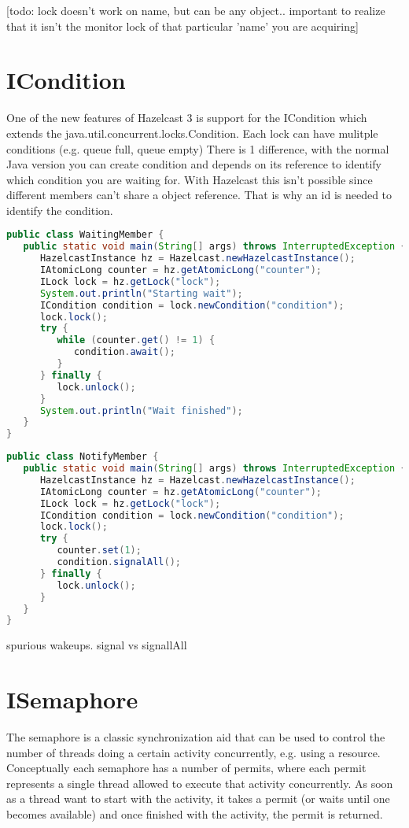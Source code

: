 [todo: lock doesn't work on name, but can be any object.. important to realize that it isn't the monitor lock of that particular 'name' you are acquiring]

\section{ICondition}
One of the new features of Hazelcast 3 is support for the ICondition which extends the java.util.concurrent.locks.Condition. Each lock can have mulitple conditions (e.g. queue full, queue empty) There is 1 difference, with the normal Java version you can create condition and depends on its reference to identify which condition you are waiting for. With Hazelcast this isn't possible since different members can't share a object reference. That is why an id is needed to identify the condition.

\begin{lstlisting}[language=java]
public class WaitingMember {
   public static void main(String[] args) throws InterruptedException {
      HazelcastInstance hz = Hazelcast.newHazelcastInstance();
      IAtomicLong counter = hz.getAtomicLong("counter");
      ILock lock = hz.getLock("lock");
      System.out.println("Starting wait");
      ICondition condition = lock.newCondition("condition");
      lock.lock();
      try {
         while (counter.get() != 1) {
            condition.await();
         }
      } finally {
         lock.unlock();
      }
      System.out.println("Wait finished");
   }
}
\end{lstlisting}

\begin{lstlisting}[language=java]
public class NotifyMember {
   public static void main(String[] args) throws InterruptedException {
      HazelcastInstance hz = Hazelcast.newHazelcastInstance();
      IAtomicLong counter = hz.getAtomicLong("counter");
      ILock lock = hz.getLock("lock");
      ICondition condition = lock.newCondition("condition");
      lock.lock();
      try {
         counter.set(1);
         condition.signalAll();
      } finally {
         lock.unlock();
      }
   }
}
\end{lstlisting}

spurious wakeups. 
signal vs signallAll

\section{ISemaphore}
The semaphore is a classic synchronization aid that can be used to control the number of threads doing a certain activity concurrently, e.g. using a resource. Conceptually each semaphore has a number of permits, where each permit represents a single thread allowed to execute that activity concurrently. As soon as a thread want to start with the activity, it takes a permit (or waits until one becomes available) and once finished with the activity, the permit is returned.

